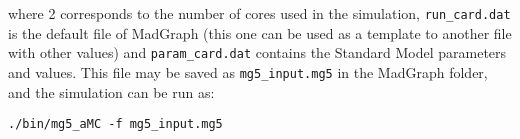\documentclass[12pt, oneside]{book}              %
\begin{document}
\noindent where 2 corresponds to the number of cores used in the simulation, 
\texttt{run\_card.dat} is the default file of MadGraph (this one can be used as a 
template to another file with other values) and \texttt{param\_card.dat} contains 
the Standard Model parameters and values. This file may be saved as 
\texttt{mg5\_input.mg5} in the MadGraph folder, and the simulation can be run as:

\noindent \texttt{./bin/mg5\_aMC -f mg5\_input.mg5}









	
\end{document}
